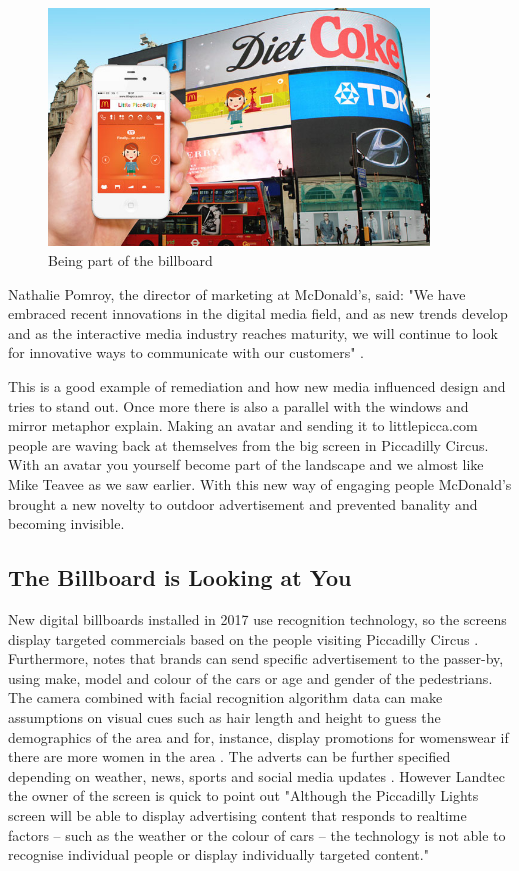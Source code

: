 \documentclass[a4paper, 11pt]{article}
\begin{document}
\begin{figure}[h!]
    \centering
    \includegraphics[width=0.9\textwidth]{avatar.png}
    \caption{Being part of the billboard \citep{campaign2014}}
    \label{fig:graph2}
\end{figure}

Nathalie Pomroy, the director of marketing at McDonald’s, said: "We have embraced recent innovations in the digital media field, and as new trends develop and as the interactive media industry reaches maturity, we will continue to look for innovative ways to communicate with our customers" \citep{campaign2014}.

This is a good example of remediation and how new media influenced design and tries to stand out. Once more there is also a parallel with the windows and mirror metaphor \cite{bolter2003} explain. Making an avatar and sending it to littlepicca.com people are waving back at themselves from the big screen in Piccadilly Circus. With an avatar you yourself become part of the landscape and we almost like Mike Teavee as we saw earlier. With this new way of engaging people McDonald's brought a new novelty to outdoor advertisement and prevented banality and becoming invisible. 

\subsection {The Billboard is Looking at You}


New digital billboards installed in 2017 use recognition technology, so the screens display targeted commercials based on the people visiting Piccadilly Circus \citep{dezeen}. Furthermore, \cite{dezeen} notes that brands can send specific advertisement to the passer-by, using make, model and colour of the cars or age and gender of the pedestrians. The camera combined with facial recognition algorithm data can make assumptions on visual cues such as hair length and height to guess the demographics of the area and for, instance, display promotions for womenswear if there are more women in the area \citep{dezeen}. The adverts can be further specified depending on weather, news, sports and social media updates \citep{dezeen}. However Landtec the owner of the screen is quick to point out "Although the Piccadilly Lights screen will be able to display advertising content that responds to realtime factors – such as the weather or the colour of cars – the technology is not able to recognise individual people or display individually targeted content."
\end{document}
